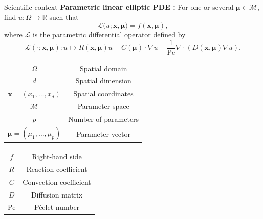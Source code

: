 \begin{frame}{Scientific context}
	\vspace{5pt}
	\textbf{Parametric linear elliptic PDE :}
	For one or several  $\bm{\mu}\in \mathcal{M}$, find $u: \Omega\to \mathbb{R}$ such that
	\begin{equation*}
		\mathcal{L}\big(u;\bm{x},\bm{\mu}\big) = f(\bm{x},\bm{\mu}),
	\end{equation*}
	where $\mathcal{L}$ is the parametric differential operator defined  by
	\begin{equation*}
		\mathcal{L}(\cdot;\bm{x},\bm{\mu}) : u \mapsto R(\bm{x},\bm{\mu}) u + C(\bm{\mu}) \cdot \nabla u - \frac{1}{\text{Pe}} \nabla \cdot (D(\bm{x},\bm{\mu}) \nabla u).
	\end{equation*}
	\begin{table}[ht!]
		\centering
		\begin{tabular}{c|c}
			$\Omega$ & Spatial domain \\
			$d$ & Spatial dimension \\
			$\bm{x}=(x_1,\dots,x_d)$ & Spatial coordinates \\
			\hline
			$\mathcal{M}$ & Parameter space \\
			$p$ & Number of parameters \\
			$\bm{\mu}=(\mu_1,\ldots,\mu_p)$ & Parameter vector \\
		\end{tabular} \hspace{10pt}
		\begin{tabular}{c|c}
			$f$ & Right-hand side \\
			$R$ & Reaction coefficient \\
			$C$ & Convection coefficient \\
			$D$ & Diffusion matrix \\
			Pe & Péclet number \\
		\end{tabular}
	\end{table}
\end{frame}

